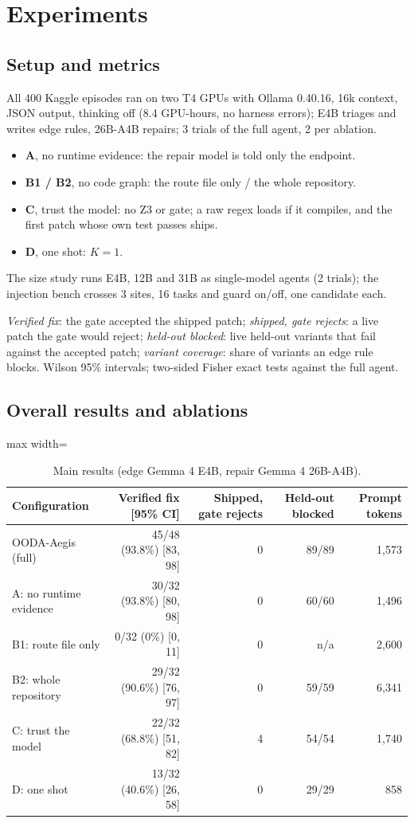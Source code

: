 \documentclass[10pt,a4paper]{article}
\begin{document}
\section{Experiments}

\subsection{Setup and metrics}
All 400 Kaggle episodes ran on two T4 GPUs with Ollama 0.40.16, 16k context, JSON output, thinking off (8.4 GPU-hours, no harness errors); E4B triages and writes edge rules, 26B-A4B repairs; 3 trials of the full agent, 2 per ablation.
\begin{itemize}
\item \textbf{A}, no runtime evidence: the repair model is told only the endpoint.
\item \textbf{B1 / B2}, no code graph: the route file only / the whole repository.
\item \textbf{C}, trust the model: no Z3 or gate; a raw regex loads if it compiles, and the first patch whose own test passes ships.
\item \textbf{D}, one shot: $K = 1$.
\end{itemize}
The size study runs E4B, 12B and 31B as single-model agents (2 trials); the injection bench crosses 3 sites, 16 tasks and guard on/off, one candidate each.

\emph{Verified fix}: the gate accepted the shipped patch; \emph{shipped, gate rejects}: a live patch the gate would reject; \emph{held-out blocked}: live held-out variants that fail against the accepted patch; \emph{variant coverage}: share of variants an edge rule blocks. Wilson 95\% intervals; two-sided Fisher exact tests against the full agent.

\subsection{Overall results and ablations}

\begin{table}[H]
\centering\small
\caption{Main results (edge Gemma 4 E4B, repair Gemma 4 26B-A4B).}
\label{tab:main}
\begin{adjustbox}{max width=\linewidth}\begin{tabular}{lrrrr}
\toprule
Configuration & Verified fix [95\% CI] & Shipped, gate rejects & Held-out blocked & Prompt tokens\\
\midrule
OODA-Aegis (full) & 45/48 (93.8\%) [83, 98] & 0 & 89/89 & 1,573\\
A: no runtime evidence & 30/32 (93.8\%) [80, 98] & 0 & 60/60 & 1,496\\
B1: route file only & 0/32 (0\%) [0, 11] & 0 & n/a & 2,600\\
B2: whole repository & 29/32 (90.6\%) [76, 97] & 0 & 59/59 & 6,341\\
C: trust the model & 22/32 (68.8\%) [51, 82] & 4 & 54/54 & 1,740\\
D: one shot & 13/32 (40.6\%) [26, 58] & 0 & 29/29 & 858\\
\bottomrule
\end{tabular}\end{adjustbox}
\end{table}
\end{document}
